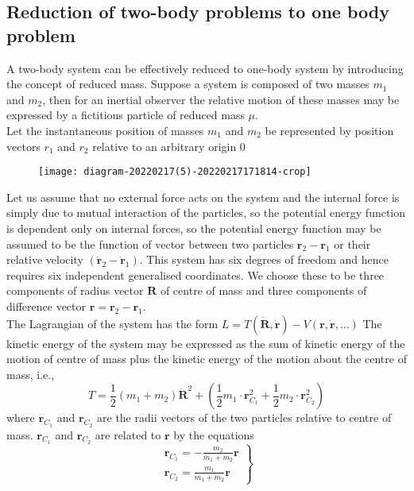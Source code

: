 \subsection{Reduction of two-body problems to one body problem}
A two-body system can be effectively reduced to one-body system by introducing the concept of reduced mass. Suppose a system is composed of two masses $m_{1}$ and $m_{2}$, then for an inertial observer the relative motion of these masses may be expressed by a fictitious particle of reduced mass $\mu$.\\
Let the instantaneous position of masses $m_{1}$ and $m_{2}$ be represented by position vectors $r_{1}$ and $r_{2}$ relative to an arbitrary origin 0\\
\begin{figure}[H]
	\centering
	\texttt{[image: diagram-20220217(5)-20220217171814-crop]}
	\caption{}
	\label{}
\end{figure}
Let us assume that no external force acts on the system and the internal force is simply due to mutual interaction of the particles, so the potential energy function is dependent only on internal forces, so the potential energy function may be assumed to be the function of vector between two particles $\mathbf{r}_{2}-\mathbf{r}_{1}$ or their relative velocity $\left(\dot{\mathbf{r}}_{2}-\dot{\mathbf{r}}_{1}\right) .$ This system has six degrees of freedom and hence requires six independent generalised coordinates. We choose these to be three components of radius vector $\mathbf{R}$ of centre of mass and three components of difference vector $\mathbf{r}=\mathbf{r}_{2}-\mathbf{r}_{1}$.\\
The Lagrangian of the system has the form $L=T(\dot{\mathbf{R}}, \dot{\mathbf{r}})-V(\mathbf{r}, \dot{\mathbf{r}}, \ldots)$
The kinetic energy of the system may be expressed as the sum of kinetic energy of the motion of centre of mass plus the kinetic energy of the motion about the centre of mass, i.e.,
$$
T=\frac{1}{2}\left(m_{1}+m_{2}\right) \dot{\mathbf{R}}^{2}+\left(\frac{1}{2} m_{1} \cdot{\mathbf{r}}_{C_{1}}^{2}+\frac{1}{2} m_{2} \cdot{\mathbf{r}}_{C_{2}}^{2}\right)
$$
where $\mathbf{r}_{C_{1}}$ and $\mathbf{r}_{C_{2}}$ are the radii vectors of the two particles relative to centre of mass. $\mathbf{r}_{C_{1}}$ and $\mathbf{r}_{C_{2}}$ are related to $\mathbf{r}$ by the equations\\
$$\left.\begin{array}{l}
	\mathbf{r}_{C_{1}}=-\frac{m_{2}}{m_{1}+m_{2}} \mathbf{r} \\
	\mathbf{r}_{C_{2}}=\frac{m_{1}}{m_{1}+m_{2}} \mathbf{r}
\end{array}\right\}$$
